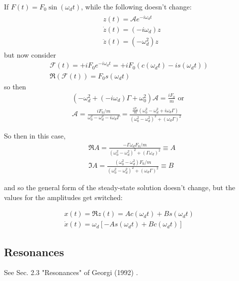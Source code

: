 \documentclass[10pt]{amsart}
\begin{document}
\begin{multicols*}{2}
If $F(t) = F_0 \sin{(\omega_d t)}$, while the following doesn't change:
\[
\begin{gathered}
	\begin{aligned}
		& z(t) = \mathcal{A} e^{-i\omega_d t} \\
		& \dot{z}(t) = (-i \omega_d) z \\
		& \ddot{z}(t) = (-\omega_d^2)z
	\end{aligned}
\end{gathered}
\]
but now consider 
\[
\begin{gathered}
	\mathcal{F}(t) = + i F_0 e^{-i\omega_d t} = +i F_0 (c(\omega_d t)  -i s(\omega_d t) ) \\
	\Re{(\mathcal{F}(t) )} = F_0 s(\omega_dt)
\end{gathered}
\]
so then
\[
\begin{gathered}
	(-\omega_d^2 + (-i \omega_d)\Gamma + \omega_0^2)\mathcal{A} = \frac{iF_0}{m}  \text{ or } 	\\
	\mathcal{A} = \frac{ iF_0 / m }{ \omega_0^2 - \omega_d^2- i\omega_d \Gamma} = \frac{ \frac{iF_0}{m} (\omega_0^2 - \omega_d^2 + i \omega_d \Gamma  )}{ (\omega_0^2 - \omega_d^2)^2 + (\omega_d \Gamma)^2 }
\end{gathered}
\]

So then in this case, 
\begin{equation}\label{Eq:AmplitudeValuesForcedOscillationsForceProportionalToSine}
	\begin{aligned}
		& \Re{A} = \frac{ -\Gamma \omega_d F_0 /m }{ (\omega_0^2 - \omega_d^2)^2 + (\Gamma \omega_d )^2 } \equiv A \\
		& \Im{A} = \frac{ (\omega_0^2 - \omega_d^2) F_0/m }{(\omega_0^2 - \omega_d^2)^2 + (\omega_d \Gamma)^2} \equiv B 
	\end{aligned}
\end{equation}

and so the general form of the steady-state solution doesn't change, but the values for the amplitudes get switched:

\[
\begin{gathered}
	x(t) = \Re{ z(t)} = Ac(\omega_d t) + Bs(\omega_dt) \\
	\dot{x}(t) = \omega_d \left[ -A s(\omega_dt) + Bc(\omega_dt) \right]
\end{gathered}
\]

\subsection{Resonances} See Sec. 2.3 "Resonances" of Georgi (1992) \cite{Geor1992}.


\end{multicols*}
\end{document}
